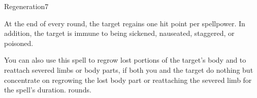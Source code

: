 \begin{spellsection}{Regeneration}{7}
    \begin{spellheader}
    \end{spellheader}
    \begin{spellcontent}
        \begin{spelltargetinginfo}
        \end{spelltargetinginfo}
        \begin{spelleffects}
            \spelleffect At the end of every round, the target regains one hit point per spellpower. In addition, the target is immune to being sickened, nauseated, staggered, or poisoned.

            \par You can also use this spell to regrow lost portions of the target's body and to reattach severed limbs or body parts, if both you and the target do nothing but concentrate on regrowing the lost body part or reattaching the severed limb for the spell's duration.
             rounds.
        \end{spelleffects}
    \end{spellcontent}
    \begin{spellfooter}
        \miscastexplode
    \end{spellfooter}
\end{spellsection}

